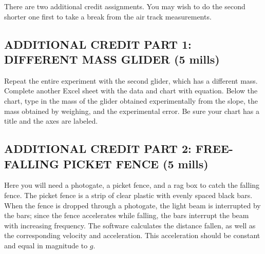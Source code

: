 There are two additional credit assignments.  You may wish to do the second shorter one first to take a break from the air track measurements.

\subsection*{ADDITIONAL CREDIT PART 1: DIFFERENT MASS GLIDER (5 mills)}

Repeat the entire experiment with the second glider, which has a different mass.  Complete another Excel sheet with the data and chart with equation.  Below the chart, type in the mass of the glider obtained experimentally from the slope, the mass obtained by weighing, and the experimental error.  Be sure your chart has a title and the axes are labeled.

\subsection*{ADDITIONAL CREDIT PART 2: FREE-FALLING PICKET FENCE (5 mills)}

Here you will need a photogate, a picket fence, and a rag box to catch the falling fence.  The picket fence is a strip of clear plastic with evenly spaced black bars.  When the fence is dropped through a photogate, the light beam is interrupted by the bars; since the fence accelerates while falling, the bars interrupt the beam with increasing frequency.  The software calculates the distance fallen, as well as the corresponding velocity and acceleration.  This acceleration should be constant and equal in magnitude to \(g\).

